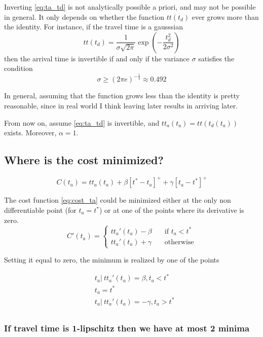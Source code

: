 \documentclass{article}
\begin{document}
Inverting \eqref{eq:ta_td} is not analytically possible a priori, and may not be possible in general.
It only depends on whether the function \(tt(t_d)\) ever grows more than the identity.
For instance, if the travel time is a gausssian
\begin{equation*}
  tt(t_d) = \frac{1}{\sigma\sqrt{2\pi}}\exp\left(-{\frac{t_d^2}{2\sigma^2}}\right)
\end{equation*}
then the arrival time is invertible if and only if the variance \(\sigma\) satisfies the condition
\[\sigma \geq (2\pi e)^{-\frac{1}{4}} \approx 0.492 \]

In general, assuming that the function grows less than the identity is pretty reasonable,
since in real world I think leaving later results in arriving later.

From now on, assume \eqref{eq:ta_td} is invertible, and \(tt_a(t_a) = tt(t_d(t_a))\) exists.
Moreover, \(\alpha = 1\).

\subsection{Where is the cost minimized?}

\begin{equation}
  \label{eq:cost_ta}
  C(t_a) = tt_a(t_a) + \beta[t^*-t_a]^+ + \gamma[t_a-t^*]^+
\end{equation}

The cost function \eqref{eq:cost_ta} could be minimized either at the only non differentiable point (for \(t_a = t^*\))
or at one of the points where its derivative is zero.
\begin{equation}
  \label{eq:cost_diff}
  C'(t_a) =
  \begin{cases}
    tt_a'(t_a) -\beta \quad &\text{if } t_a < t^* \\
    tt_a'(t_a) + \gamma \quad &\text{otherwise}
  \end{cases}
\end{equation}

Setting it equal to zero, the minimum is realized by one of the points

\begin{align*}
  & t_a |\ tt_a'(t_a) = \beta, t_a < t^* \\
  & t_a = t^* \\
  & t_a |\ tt_a'(t_a) = -\gamma, t_a > t^* \\
\end{align*}

\subsubsection{If travel time is 1-lipschitz then we have at most 2 minima}
\end{document}
